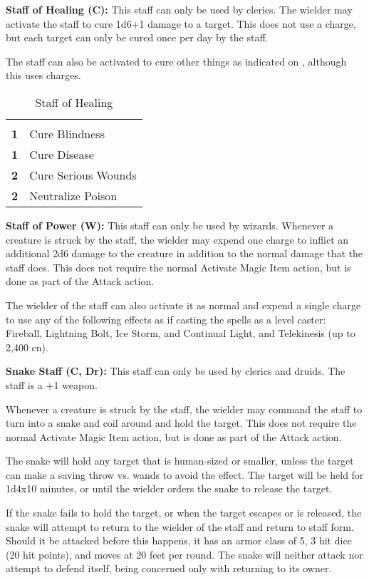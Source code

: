 \begin{multicols*}{2}
\textbf{Staff of Healing (C):} This staff can only be used by clerics. The wielder may activate the staff to cure 1d6+1 damage to a target. This does not use a charge, but each target can only be cured once per day by the staff.

The staff can also be activated to cure other things as indicated on , although this uses charges.

\begin {table}[H]
  \caption{Staff of Healing}\label{tab:Staff of Healing}
  \begin{tabularx}{\columnwidth}{>{\bfseries}YY}
	 & \\
	1 & Cure Blindness\\
	1 & Cure Disease\\
	2 & Cure Serious Wounds\\
	2 & Neutralize Poison
  \end {tabularx}
\end {table}

\textbf{Staff of Power (W):} This staff can only be used by wizards. Whenever a creature is struck by the staff, the wielder may expend one charge to inflict an additional 2d6 damage to the creature in addition to the normal damage that the staff does. This does not require the normal Activate Magic Item action, but is done as part of the Attack action.

The wielder of the staff can also activate it as normal and expend a single charge to use any of the following effects as if casting the spells as a  level caster: Fireball, Lightning Bolt, Ice Storm, and Continual Light, and Telekinesis (up to 2,400 cn).

\textbf{Snake Staff (C, Dr):} This staff can only be used by clerics and druids. The staff is a +1 weapon.

Whenever a creature is struck by the staff, the wielder may command the staff to turn into a snake and coil around and hold the target. This does not require the normal Activate Magic Item action, but is done as part of the Attack action.

The snake will hold any target that is human-sized or smaller, unless the target can make a saving throw vs. wands to avoid the effect. The target will be held for 1d4x10 minutes, or until the wielder orders the snake to release the target.

If the snake fails to hold the target, or when the target escapes or is released, the snake will attempt to return to the wielder of the staff and return to staff form. Should it be attacked before this happens, it has an armor class of 5, 3 hit dice (20 hit points), and moves at 20 feet per round. The snake will neither attack nor attempt to defend itself, being concerned only with returning to its owner.


\end{multicols*}
